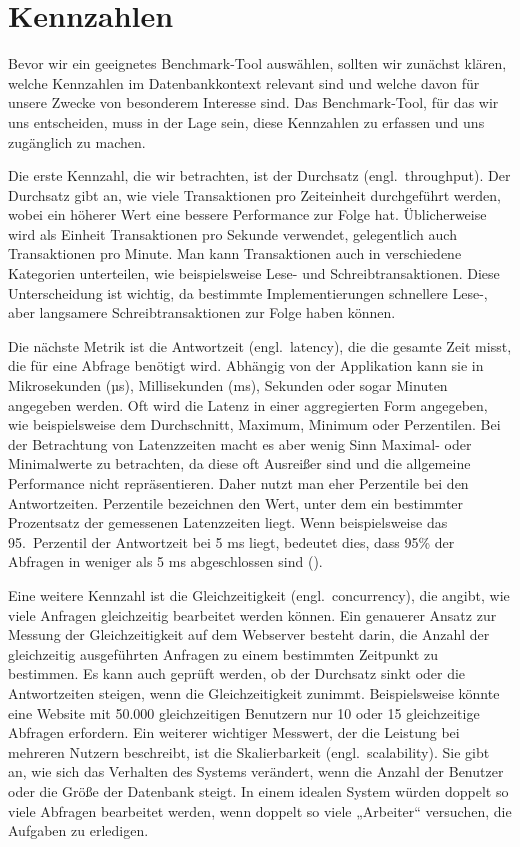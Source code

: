 \section{Kennzahlen}\label{sec:einleitung-kennzahlen}

Bevor wir ein geeignetes Benchmark-Tool auswählen, sollten wir zunächst klären, welche Kennzahlen im Datenbankkontext relevant sind und welche davon für unsere Zwecke von besonderem Interesse sind.
Das Benchmark-Tool, für das wir uns entscheiden, muss in der Lage sein, diese Kennzahlen zu erfassen und uns zugänglich zu machen.

Die erste Kennzahl, die wir betrachten, ist der Durchsatz (engl.\ throughput).
Der Durchsatz gibt an, wie viele Transaktionen pro Zeiteinheit durchgeführt werden, wobei ein höherer Wert eine bessere Performance zur Folge hat.
Üblicherweise wird als Einheit Transaktionen pro Sekunde verwendet, gelegentlich auch Transaktionen pro Minute.
Man kann Transaktionen auch in verschiedene Kategorien unterteilen, wie beispielsweise Lese- und Schreibtransaktionen.
Diese Unterscheidung ist wichtig, da bestimmte Implementierungen schnellere Lese-, aber langsamere Schreibtransaktionen zur Folge haben können.

Die nächste Metrik ist die Antwortzeit (engl.\ latency), die die gesamte Zeit misst, die für eine Abfrage benötigt wird.
Abhängig von der Applikation kann sie in Mikrosekunden (µs), Millisekunden (ms), Sekunden oder sogar Minuten angegeben werden.
Oft wird die Latenz in einer aggregierten Form angegeben, wie beispielsweise dem Durchschnitt, Maximum, Minimum oder Perzentilen.
Bei der Betrachtung von Latenzzeiten macht es aber wenig Sinn Maximal- oder Minimalwerte zu betrachten, da diese oft Ausreißer sind und die allgemeine Performance nicht repräsentieren.
Daher nutzt man eher Perzentile bei den Antwortzeiten.
Perzentile bezeichnen den Wert, unter dem ein bestimmter Prozentsatz der gemessenen Latenzzeiten liegt.
Wenn beispielsweise das 95.\ Perzentil der Antwortzeit bei 5 ms liegt, bedeutet dies, dass 95\% der Abfragen in weniger als 5 ms abgeschlossen sind (\cite{perzentil_erklaerung}).

Eine weitere Kennzahl ist die Gleichzeitigkeit (engl.\ concurrency), die angibt, wie viele Anfragen gleichzeitig bearbeitet werden können.
Ein genauerer Ansatz zur Messung der Gleichzeitigkeit auf dem Webserver besteht darin, die Anzahl der gleichzeitig ausgeführten Anfragen zu einem bestimmten Zeitpunkt zu bestimmen.
Es kann auch geprüft werden, ob der Durchsatz sinkt oder die Antwortzeiten steigen, wenn die Gleichzeitigkeit zunimmt.
Beispielsweise könnte eine Website mit 50.000 gleichzeitigen Benutzern nur 10 oder 15 gleichzeitige Abfragen erfordern.
Ein weiterer wichtiger Messwert, der die Leistung bei mehreren Nutzern beschreibt, ist die Skalierbarkeit (engl.\ scalability).
Sie gibt an, wie sich das Verhalten des Systems verändert, wenn die Anzahl der Benutzer oder die Größe der Datenbank steigt.
In einem idealen System würden doppelt so viele Abfragen bearbeitet werden, wenn doppelt so viele „Arbeiter“ versuchen, die Aufgaben zu erledigen.


